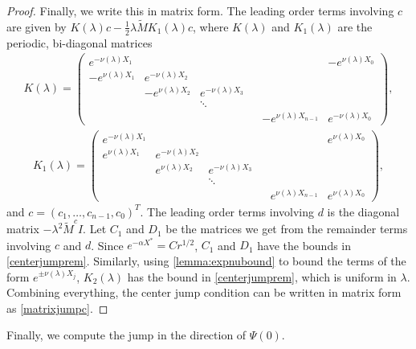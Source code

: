 \documentclass[thesis.tex]{subfiles}
\begin{document}
\begin{lemma}
\begin{proof}
Finally, we write this in matrix form. The leading order terms involving $c$ are given by $K(\lambda)c -\frac{1}{2} \lambda \tilde{M} K_1(\lambda) c$, where $K(\lambda)$ and $K_1(\lambda)$ are the periodic, bi-diagonal matrices
\begin{align*}
K(\lambda) =  
\begin{pmatrix}
e^{-\nu(\lambda)X_1} & & & & & -e^{\nu(\lambda)X_0} \\
-e^{\nu(\lambda)X_1} & e^{-\nu(\lambda)X_2} \\
& -e^{\nu(\lambda)X_2} & e^{-\nu(\lambda)X_3} \\
  & & \ddots & && \\
& & & & -e^{\nu(\lambda)X_{n-1}} & e^{-\nu(\lambda)X_0}
\end{pmatrix},
\end{align*}
\begin{align*}
K_1(\lambda) =  
\begin{pmatrix}
e^{-\nu(\lambda)X_1} & & & & & e^{\nu(\lambda)X_0} \\
e^{\nu(\lambda)X_1} & e^{-\nu(\lambda)X_2} \\
& e^{\nu(\lambda)X_2} & e^{-\nu(\lambda)X_3} \\
 & & \ddots & &&   \\
& & & & e^{\nu(\lambda)X_{n-1}} & e^{\nu(\lambda)X_0}
\end{pmatrix},
\end{align*}
and $c = (c_1, \dots, c_{n-1}, c_0)^T$. The leading order terms involving $d$ is the diagonal matrix $-\lambda^2 \tilde{M}^c I$. Let $C_1$ and $D_1$ be the matrices we get from the remainder terms involving $c$ and $d$. Since $e^{-\alpha X^*} = C r^{1/2}$, $C_1$ and $D_1$ have the bounds in \cref{centerjumprem}. Similarly, using \cref{lemma:expnubound} to bound the terms of the form $e^{\pm \nu(\lambda)X_j}$, $K_2(\lambda)$ has the bound in \cref{centerjumprem}, which is uniform in $\lambda$. Combining everything, the center jump condition can be written in matrix form as \cref{matrixjumpc}.
\end{proof}
\end{lemma}

Finally, we compute the jump in the direction of $\Psi(0)$.
\end{document}
